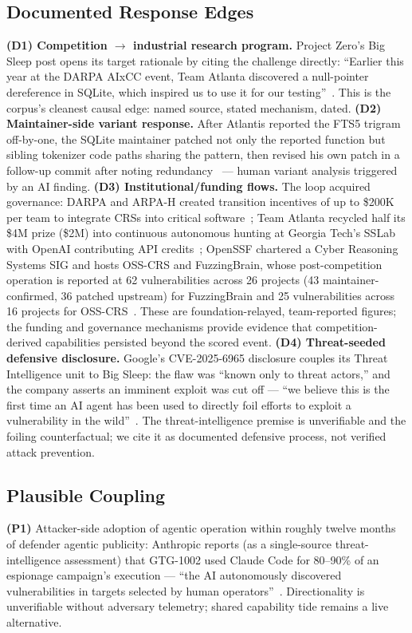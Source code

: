 \documentclass[conference,compsoc]{IEEEtran}
\begin{document}
\subsection{Documented Response Edges}
\textbf{(D1) Competition $\rightarrow$ industrial research program.} Project Zero's Big Sleep
post opens its target rationale by citing the challenge directly: ``Earlier this year at the
DARPA AIxCC event, Team Atlanta discovered a null-pointer dereference in SQLite, which inspired
us to use it for our testing''~\cite{bigsleep2024}. This is the corpus's cleanest causal
edge: named source, stated mechanism, dated.
\textbf{(D2) Maintainer-side variant response.} After Atlantis reported the FTS5 trigram
off-by-one, the SQLite maintainer patched not only the reported function but sibling tokenizer
code paths sharing the pattern, then revised his own patch in a follow-up commit after noting
redundancy~\cite{taasc2024} --- human variant analysis triggered by an AI finding.
\textbf{(D3) Institutional/funding flows.} The loop acquired governance: DARPA and ARPA-H
created transition incentives of up to \$200K per team to integrate CRSs into critical software~\cite{darparesults2025};
Team Atlanta recycled half its \$4M prize (\$2M) into continuous autonomous hunting at Georgia
Tech's SSLab with OpenAI contributing API credits~\cite{taafc2025}; OpenSSF chartered a Cyber
Reasoning Systems SIG and hosts OSS-CRS and FuzzingBrain, whose post-competition operation is
reported at 62 vulnerabilities across 26 projects (43 maintainer-confirmed, 36 patched upstream)
for FuzzingBrain and 25 vulnerabilities across 16 projects for OSS-CRS~\cite{openssfaixcc2026}.
These are foundation-relayed, team-reported figures; the funding and governance mechanisms provide evidence that competition-derived capabilities persisted beyond the scored event.
\textbf{(D4) Threat-seeded defensive disclosure.} Google's CVE-2025-6965 disclosure couples its
Threat Intelligence unit to Big Sleep: the flaw was ``known only to threat actors,'' and the
company asserts an imminent exploit was cut off --- ``we believe this is the first time an AI
agent has been used to directly foil efforts to exploit a vulnerability in the
wild''~\cite{bloggoogle2025,nvd6965}. The threat-intelligence premise is unverifiable and the
foiling counterfactual; we cite it as documented defensive process, not verified attack
prevention.

\subsection{Plausible Coupling}
\textbf{(P1)} Attacker-side adoption of agentic operation within roughly twelve months of
defender agentic publicity: Anthropic reports (as a single-source threat-intelligence assessment) that GTG-1002 used Claude Code for 80--90\% of an
espionage campaign's execution --- ``the AI autonomously discovered vulnerabilities in targets
selected by human operators''~\cite{anthropicgtgreport2025,anthropicgtg2025}. Directionality is
unverifiable without adversary telemetry; shared capability tide remains a live alternative.
\end{document}
